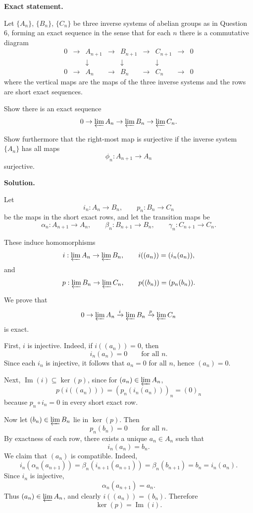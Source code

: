 \documentclass[12pt,a4paper]{article}
\theoremstyle{plain}
\theoremstyle{definition}      %
\begin{document}
\textbf{Exact statement.}

Let \(\{A_n\}\), \(\{B_n\}\), \(\{C_n\}\) be three inverse systems of abelian groups as in Question 6, forming an exact sequence in the sense that for each \(n\) there is a commutative diagram
\[
\begin{array}{ccccccccc}
	0 & \to & A_{n+1} & \to & B_{n+1} & \to & C_{n+1} & \to & 0 \\
	&     & \downarrow &     & \downarrow &     & \downarrow &     &   \\
	0 & \to & A_n & \to & B_n & \to & C_n & \to & 0
\end{array}
\]
where the vertical maps are the maps of the three inverse systems and the rows are short exact sequences.

Show there is an exact sequence
\[
0\to \varprojlim A_n \to \varprojlim B_n \to \varprojlim C_n .
\]

Show furthermore that the right-most map is surjective if the inverse system \(\{A_n\}\) has all maps
\[
\phi_n:A_{n+1}\to A_n
\]
surjective.

\bigskip
\textbf{Solution.}

Let
\[
i_n:A_n\to B_n,\qquad p_n:B_n\to C_n
\]
be the maps in the short exact rows, and let the transition maps be
\[
\alpha_n:A_{n+1}\to A_n,\qquad
\beta_n:B_{n+1}\to B_n,\qquad
\gamma_n:C_{n+1}\to C_n.
\]

These induce homomorphisms
\[
i:\varprojlim A_n\to \varprojlim B_n,\qquad
i((a_n))=(i_n(a_n)),
\]
and
\[
p:\varprojlim B_n\to \varprojlim C_n,\qquad
p((b_n))=(p_n(b_n)).
\]

We prove that
\[
0\to \varprojlim A_n \xrightarrow{i} \varprojlim B_n \xrightarrow{p} \varprojlim C_n
\]
is exact.

\medskip
First, \(i\) is injective. Indeed, if \(i((a_n))=0\), then
\[
i_n(a_n)=0 \qquad \text{for all }n.
\]
Since each \(i_n\) is injective, it follows that \(a_n=0\) for all \(n\), hence \((a_n)=0\).

\medskip
Next, \(\operatorname{Im}(i)\subseteq \ker(p)\), since for \((a_n)\in\varprojlim A_n\),
\[
p(i((a_n)))=(p_n(i_n(a_n)))_n=(0)_n
\]
because \(p_n\circ i_n=0\) in every short exact row.

\medskip
Now let \((b_n)\in\varprojlim B_n\) lie in \(\ker(p)\). Then
\[
p_n(b_n)=0
\qquad \text{for all }n.
\]
By exactness of each row, there exists a unique \(a_n\in A_n\) such that
\[
i_n(a_n)=b_n.
\]
We claim that \((a_n)\) is compatible. Indeed,
\[
i_n(\alpha_n(a_{n+1}))
=
\beta_n(i_{n+1}(a_{n+1}))
=
\beta_n(b_{n+1})
=
b_n
=
i_n(a_n).
\]
Since \(i_n\) is injective,
\[
\alpha_n(a_{n+1})=a_n.
\]
Thus \((a_n)\in\varprojlim A_n\), and clearly \(i((a_n))=(b_n)\). Therefore
\[
\ker(p)=\operatorname{Im}(i).
\]
\end{document}
